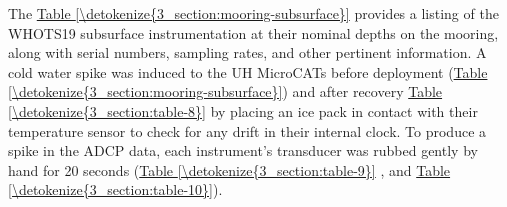 \documentclass[a4paper,10pt,english,openany,oneside]{sphinxmanual}
\begin{document}
\sphinxAtStartPar
The \hyperref[\detokenize{3_section:mooring-subsurface}]{Table \ref{\detokenize{3_section:mooring-subsurface}}} provides a listing of the WHOTS\sphinxhyphen{}19 subsurface
instrumentation at their nominal depths on the mooring, along with serial
numbers, sampling rates, and other pertinent information. A cold water spike
was induced to the UH MicroCATs before deployment
(\hyperref[\detokenize{3_section:mooring-subsurface}]{Table \ref{\detokenize{3_section:mooring-subsurface}}}) and after recovery \hyperref[\detokenize{3_section:table-8}]{Table \ref{\detokenize{3_section:table-8}}} by placing
an ice pack in contact with their temperature sensor to check for any drift in
their internal clock. To produce a spike in the ADCP data, each instrument’s
transducer was rubbed gently by hand for 20 seconds (\hyperref[\detokenize{3_section:table-9}]{Table \ref{\detokenize{3_section:table-9}}}
, and \hyperref[\detokenize{3_section:table-10}]{Table \ref{\detokenize{3_section:table-10}}}).
\end{document}
